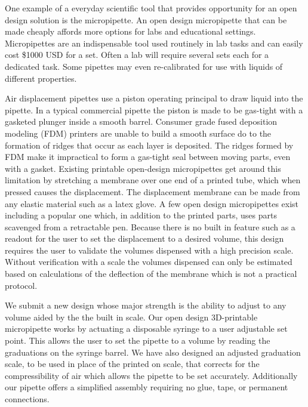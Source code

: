 \documentclass{naturegraphicx}
\begin{document}
One example of a everyday scientific tool that provides opportunity for an open design solution is the micropipette.
An open design micropipette that can be made cheaply affords more options for labs and educational settings.
Micropipettes are an indispensable tool used routinely in lab tasks and can easily cost \$1000 USD for a set.
Often a lab will require several sets each for a dedicated task.
Some pipettes may even re-calibrated for use with liquids of different properties.

Air displacement pipettes use a piston operating principal to draw liquid into the pipette\cite{ISO8655}.
In a typical commercial pipette the piston is made to be gas-tight with a gasketed plunger inside a smooth barrel.
Consumer grade fused deposition modeling (FDM) printers are unable to build a smooth surface do to the formation of ridges that occur as each layer is deposited\cite{Takagishi2017}.
The ridges formed by FDM make it impractical to form a gas-tight seal between moving parts, even with a gasket.
Existing printable open-design micropipettes get around this limitation by stretching a membrane over one end of a printed tube, which when pressed causes the displacement.
The displacement membrane can be made from any elastic material such as a latex glove.
A few open design micropipettes exist including a popular one which, in addition to the printed parts, uses parts scavenged from a retractable pen\cite{Baden2014}.
Because there is no built in feature such as a readout for the user to set the displacement to a desired volume, this design requires the user to validate the volumes dispensed with a high precision scale.
Without verification with a scale the volumes dispensed can only be estimated based on calculations of the deflection of the membrane which is not a practical protocol.

We submit a new design whose major strength is the ability to adjust to any volume aided by the the built in scale.
Our open design 3D-printable micropipette works by actuating a disposable syringe to a user adjustable set point.
This allows the user to set the pipette to a volume by reading the graduations on the syringe barrel.
We have also designed an adjusted graduation scale, to be used in place of the printed on scale, that corrects for the compressibility of air which allows the pipette to be set accurately.
Additionally our pipette offers a simplified assembly requiring no glue, tape, or permanent connections.
\end{document}
